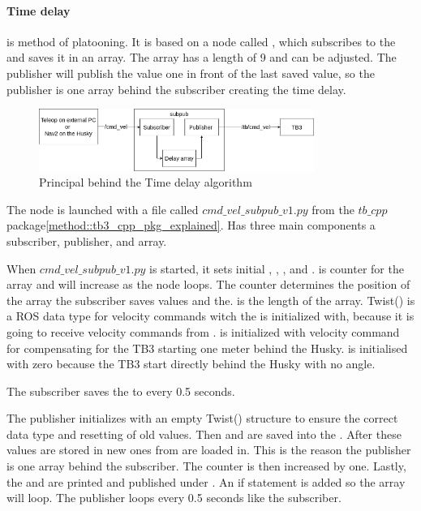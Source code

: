 \paragraph{Time delay} \label{Time delay} is method of platooning. It is based on a node called , which subscribes to the  and saves it in an array. The array has a length of 9 and can be adjusted. The publisher will publish the value one in front of the last saved value, so the publisher is one array behind the subscriber creating the time delay. 
\begin{figure}[H]
    \centering
    \includegraphics[width = 0.8\textwidth]{Figures/drawio/Time_delay_pricipal.drawio.png}
    \caption{Principal behind the Time delay algorithm}
    \label{fig:TimeDelayPrincipal}
\end{figure}

The node  is launched with a file called $cmd\_vel\_subpub\_v1.py$ from the $tb\_cpp$ package\ref{method::tb3_cpp_pkg_explained}. Has three main components a subscriber, publisher, and array. 

When $cmd\_vel\_subpub\_v1.py$ is started, it sets initial , , ,  and .  is counter for the array and will increase as the  node loops. The counter determines the position of the array the subscriber saves values and the.  is the length of the array. Twist() is a ROS data type for velocity commands witch the  is initialized with, because it is going to receive velocity commands from .  is initialized with velocity command for compensating for the TB3 starting one meter behind the Husky.  is initialised with zero because the TB3 start directly behind the Husky with no angle.

The subscriber saves the  to  every 0.5 seconds. 

The publisher initializes  with an empty Twist() structure to ensure the correct data type and resetting of old values. Then  and are saved into the . After these values are stored in  new ones from  are loaded in. This is the reason the publisher is one array behind the subscriber. The counter is then increased by one. Lastly, the  and  are printed and published under . An if statement is added so the array will loop. The publisher loops every 0.5 seconds like the subscriber. 


